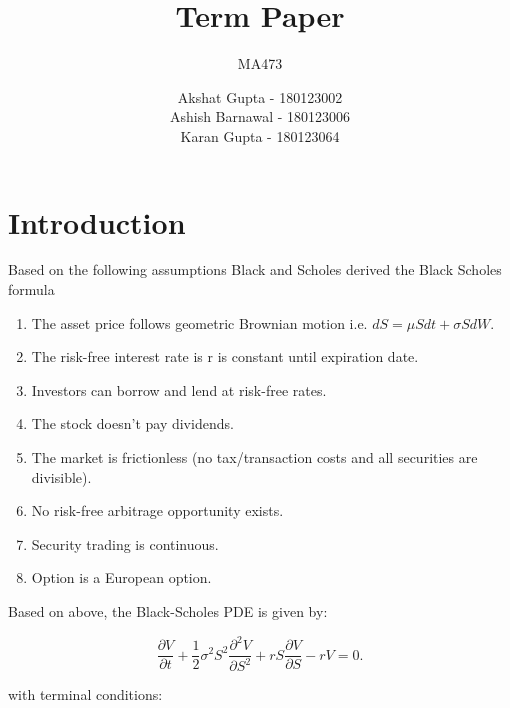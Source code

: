 \documentclass[12pt]{article}
\begin{document}

\title{Term Paper }
\author{MA473}
\date{Akshat Gupta - 180123002 \\
Ashish Barnawal - 180123006\\
Karan Gupta - 180123064
}
\maketitle

\section{Introduction}

\hspace{.5cm} Based on the following assumptions Black and Scholes derived the Black Scholes formula

\begin{enumerate}
    \item The asset price follows geometric Brownian motion i.e. $d S=\mu S d t+\sigma S d W$.

\item The risk-free interest rate is $\mathrm{r}$ is constant until expiration date.

\item Investors can borrow and lend at risk-free rates.
\item The stock doesn't pay dividends.

\item The market is frictionless (no tax/transaction costs and all securities are divisible).

\item No risk-free arbitrage opportunity exists.

\item Security trading is continuous.

\item Option is a European option.
\end{enumerate}

Based on above, the Black-Scholes PDE is given by:

$$
\frac{\partial V}{\partial t}+\frac{1}{2} \sigma^{2} S^{2} \frac{\partial^{2} V}{\partial S^{2}}+r S \frac{\partial V}{\partial S}-r V=0.
$$

with terminal conditions:
\end{document}
